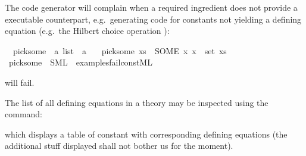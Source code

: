\begin{isabellebody}
\begin{isamarkuptext}
  The code generator will complain when a required
  ingredient does not provide a executable counterpart,
  e.g.~generating code
  for constants not yielding
  a defining equation (e.g.~the Hilbert choice
  operation ):%
\end{isamarkuptext}%
\isamarkuptrue%
%
\isadelimML
%
\endisadelimML
%
\isatagML
%
\endisatagML
{\isafoldML}%
%
\isadelimML
%
\endisadelimML
{}\isamarkupfalse%
\isanewline
\ \ pick{\isacharunderscore}some\ {\isacharcolon}{\isacharcolon}\ {\isachardoublequoteopen}{\isacharprime}a\ list\ {\isasymRightarrow}\ {\isacharprime}a{\isachardoublequoteclose}\ \isanewline
\ \ {\isachardoublequoteopen}pick{\isacharunderscore}some\ xs\ {\isacharequal}\ {\isacharparenleft}SOME\ x{\isachardot}\ x\ {\isasymin}\ set\ xs{\isacharparenright}{\isachardoublequoteclose}%
\isadelimML
%
\endisadelimML
%
\isatagML
%
\endisatagML
{\isafoldML}%
%
\isadelimML
%
\endisadelimML
{}\isamarkupfalse%
\ pick{\isacharunderscore}some\ \ SML\ \ {\isachardoublequoteopen}examples{\isacharslash}fail{\isacharunderscore}const{\isachardot}ML{\isachardoublequoteclose}%
\begin{isamarkuptext}%
\noindent will fail.%
\end{isamarkuptext}%
\isamarkuptrue%
%
\isamarkuptrue%
%
\begin{isamarkuptext}%
The list of all defining equations in a theory may be inspected
  using the \isa{{\isasymPRINTCODESETUP}} command:%
\end{isamarkuptext}%
\isamarkuptrue%
\isamarkupfalse%
%
\begin{isamarkuptext}%
\noindent which displays a table of constant with corresponding
  defining equations (the additional stuff displayed
  shall not bother us for the moment).


\end{isamarkuptext}
\end{isabellebody}
